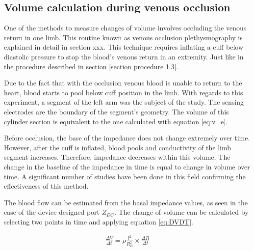 
\subsection{Volume calculation during venous occlusion}
\label{section procedure 4.1}
One of the methods to measure changes of volume involves occluding the venous return in one limb. This routine known as venous occlusion plethysmography is explained in detail in section xxx. This technique requires inflating a cuff below diastolic pressure to stop the blood's venous return in an extremity. Just like in the procedure described in section \ref{section procedure 1.3}. 


Due to the fact that with the occlusion venous blood is unable to return to the heart, blood starts to pool below cuff position in the limb. With regards to this experiment, a segment of the left arm was the subject of the study. The sensing electrodes are the boundary of the segment's geometry. The volume of this cylinder section is equivalent to the one calculated with equation \ref{eq:v_e}. 

Before occlusion, the base of the impedance does not change extremely over time. However, after the cuff is inflated, blood pools and conductivity of the limb segment increases. Therefore, impedance decreases within this volume. The change in the baseline of the impedance in time is equal to change in volume over time. A significant number of studies have been done in this field confirming the effectiveness of this method. 


The blood flow can be estimated from the basal impedance values, as seen in the case of the device designed port $Z_{DC}$. The change of volume can be calculated by selecting two points in time and applying equation \ref{eq:DVDT}.


\begin{align}
	\label{eq:DVDT}
	\frac{\Delta V}{\Delta t}= \rho \frac{l^2}{R_B^2} \times \frac{\Delta R}{\Delta t}
\end{align} 

